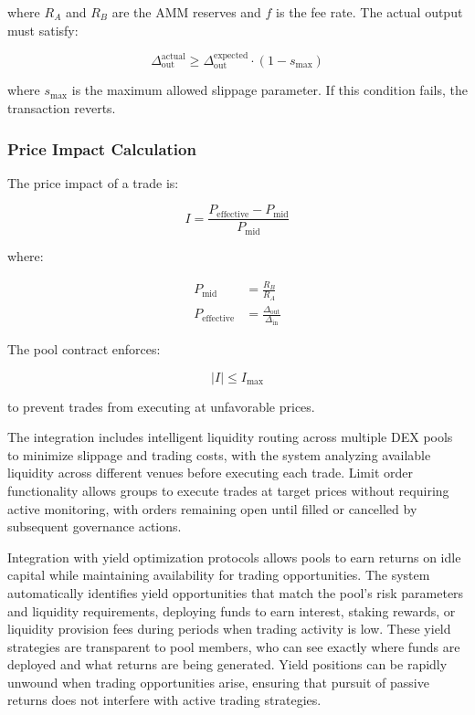 \documentclass[11pt,a4paper]{article}
\begin{document}
where $R_A$ and $R_B$ are the AMM reserves and $f$ is the fee rate. The actual output must satisfy:

\begin{equation}
\Delta_{\text{out}}^{\text{actual}} \geq \Delta_{\text{out}}^{\text{expected}} \cdot (1 - s_{\text{max}})
\end{equation}

where $s_{\text{max}}$ is the maximum allowed slippage parameter. If this condition fails, the transaction reverts.

\subsubsection{Price Impact Calculation}

The price impact of a trade is:

\begin{equation}
I = \frac{P_{\text{effective}} - P_{\text{mid}}}{P_{\text{mid}}}
\end{equation}

where:

\begin{align}
P_{\text{mid}} &= \frac{R_B}{R_A} \\
P_{\text{effective}} &= \frac{\Delta_{\text{out}}}{\Delta_{\text{in}}}
\end{align}

The pool contract enforces:

\begin{equation}
|I| \leq I_{\text{max}}
\end{equation}

to prevent trades from executing at unfavorable prices.

The integration includes intelligent liquidity routing across multiple DEX pools to minimize slippage and trading costs, with the system analyzing available liquidity across different venues before executing each trade. Limit order functionality allows groups to execute trades at target prices without requiring active monitoring, with orders remaining open until filled or cancelled by subsequent governance actions.

Integration with yield optimization protocols allows pools to earn returns on idle capital while maintaining availability for trading opportunities. The system automatically identifies yield opportunities that match the pool's risk parameters and liquidity requirements, deploying funds to earn interest, staking rewards, or liquidity provision fees during periods when trading activity is low. These yield strategies are transparent to pool members, who can see exactly where funds are deployed and what returns are being generated. Yield positions can be rapidly unwound when trading opportunities arise, ensuring that pursuit of passive returns does not interfere with active trading strategies.
\end{document}
